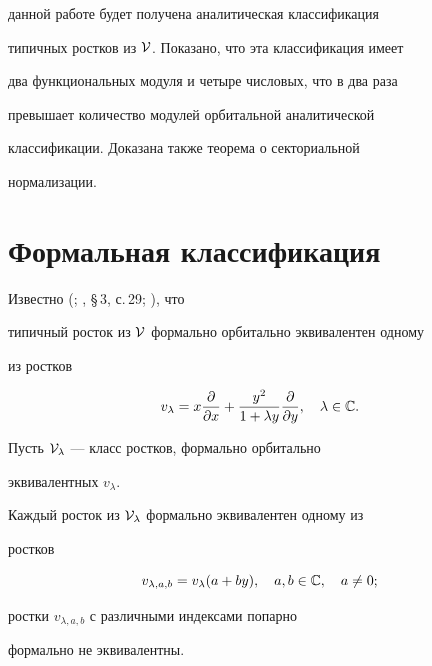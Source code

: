 данной работе будет получена аналитическая классификация


типичных ростков из ${\cal V}$. Показано, что эта классификация имеет


два функциональных модуля и четыре числовых, что в два раза


превышает количество модулей орбитальной аналитической


классификации. Доказана также теорема о секториальной


нормализации.





\section{Формальная классификация}





Известно (\cite{1}; \cite{2}, \S\,3, с.\,29; \cite{4}), что


типичный росток из ${\cal V}$ формально орбитально эквивалентен одному


из ростков


$$


v_\lambda=x\frac{\partial}{\partial


x}+\frac{y^2}{1+\lambda y} \frac{\partial}{\partial y},


\quad\lambda\in{\Bbb C}.


$$





Пусть ${\cal V}_\lambda$ --- класс ростков, формально орбитально


эквивалентных $v_\lambda$.





\begin{thm}


Каждый росток из ${\cal V}_\lambda$ формально эквивалентен одному из


ростков


$$


v_{\lambda,a,b}=v_\lambda (a+by),\quad a,b\in\Bbb C,\quad


a\ne 0;


$$


ростки $v_{\lambda,a,b}$ с различными индексами попарно


формально не эквивалентны.


\end{thm}





